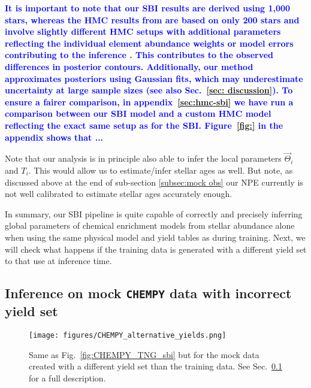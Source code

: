 \documentclass{aa}
\newcommand{\resub}[1]{\textbf{\textcolor{blue}{#1}}}
\begin{document}
\resub{It is important to note that our SBI results are derived using 1,000 stars, whereas the HMC results from \citet{Philcox_2019} are based on only 200 stars and involve slightly different HMC setups with additional parameters reflecting the individual element abundance weights or model errors contributing to the inference \citep[see section 4 of][]{Philcox_2019}. This contributes to the observed differences in posterior contours. Additionally, our method approximates posteriors using Gaussian fits, which may underestimate uncertainty at large sample sizes (see also Sec.~\ref{sec: discussion}). To ensure a fairer comparison, in appendix~\ref{sec:hmc-sbi} we have run a comparison between our SBI model and a custom HMC model reflecting the exact same setup as for the SBI. Figure~\ref{fig:} in the appendix shows that ...}

Note that our analysis is in principle also able to infer the local parameters $\Vec{\Theta}_i$ and $T_i$. This would allow us to estimate/infer stellar ages as well. But note, as discussed above at the end of sub-section \ref{subsec:mock obs} our NPE currently is not well calibrated to estimate stellar ages accurately enough.

In summary, our SBI pipeline is quite capable of correctly and precisely inferring  global parameters of chemical enrichment models from stellar abundance alone when using the same physical model and yield tables as during training. Next, we will check what happens if the training data is generated with a different yield set to that use at inference time.


\subsection{Inference on mock \texttt{CHEMPY} data with incorrect yield set}
\label{subsec:mocks_wrong_yield}

\begin{figure}
    \centering
    \texttt{[image: figures/CHEMPY\_alternative\_yields.png]}
    \vspace{-.25cm}
    \caption{Same as Fig.~\ref{fig:CHEMPY_TNG_sbi} but for the mock data created with a different yield set than the training data. See Sec.~\ref{subsec:mocks_wrong_yield} for a full description.}
    \label{fig:CHEMPY_alt_sbi} 
\end{figure}
\end{document}
